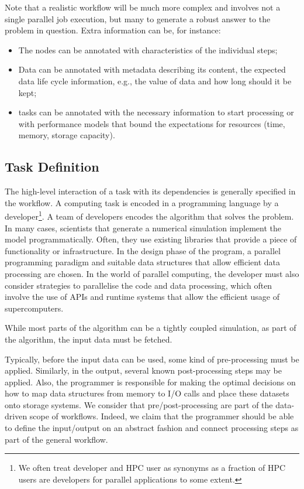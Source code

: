 \documentclass[a4paper]{article}
\begin{document}
{{Note that a realistic workflow will be much more complex and involves not a single parallel job execution, but many to generate a robust answer to the problem in question. Extra information can be, for instance:

\begin{itemize}

\item The nodes can be annotated with characteristics of the individual steps;

\item Data can be annotated with metadata describing its content, the expected data life cycle information, e.g., the value of data and how long should it be kept;

\item tasks can be annotated with the necessary information to start processing or with performance models that bound the expectations for resources (time, memory, storage capacity).

\end{itemize}

\subsection{Task Definition}

The high-level interaction of a task with its dependencies is generally specified in the workflow.
A computing task is encoded in a programming language by a developer\footnote{We often treat developer and HPC user as synonyms as a fraction of HPC users are developers for parallel applications to some extent.}.
A team of developers encodes the algorithm that solves the problem. In many cases, scientists that generate a numerical simulation implement the model programmatically.
Often, they use existing libraries that provide a piece of functionality or infrastructure.
In the design phase of the program, a parallel programming paradigm and suitable data structures that allow efficient data processing are chosen.
In the world of parallel computing, the developer must also consider strategies to parallelise the code and data processing, which often involve the use of APIs and runtime systems that allow the efficient usage of supercomputers.

While most parts of the algorithm can be a tightly coupled simulation, as part of the algorithm, the input data must be fetched.

Typically, before the input data can be used, some kind of pre-processing must be applied. Similarly, in the output, several known post-processing steps may be applied.
Also, the programmer is responsible for making the optimal decisions on how to map data structures from memory to I/O calls and place these datasets onto storage systems.
We consider that pre/post-processing are part of the data-driven scope of workflows.
Indeed, we claim that the programmer should be able to define the input/output on an abstract fashion and connect processing steps as part of the general workflow.

}}
\end{document}
